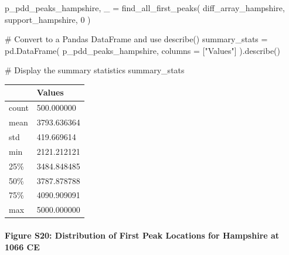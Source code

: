 \documentclass[
  11pt,
  letterpaper,
  DIV=11,
  numbers=noendperiod]{scrartcl}
\let\oldparagraph\paragraph
\renewcommand{\paragraph}[1]{\oldparagraph{#1}\mbox{}}
\newenvironment{Shaded}{\begin{snugshade}}{\end{snugshade}}
\newcommand{\CommentTok}[1]{\textcolor[rgb]{0.37,0.37,0.37}{#1}}
\newcommand{\DecValTok}[1]{\textcolor[rgb]{0.68,0.00,0.00}{#1}}
\newcommand{\NormalTok}[1]{\textcolor[rgb]{0.00,0.23,0.31}{#1}}
\newcommand{\OperatorTok}[1]{\textcolor[rgb]{0.37,0.37,0.37}{#1}}
\newcommand{\StringTok}[1]{\textcolor[rgb]{0.13,0.47,0.30}{#1}}
\begin{document}
\begin{Shaded}
\begin{Highlighting}[]
\NormalTok{p\_pdd\_peaks\_hampshire, \_ }\OperatorTok{=}\NormalTok{ find\_all\_first\_peaks(}
\NormalTok{    diff\_array\_hampshire, }
\NormalTok{    support\_hampshire, }
    \DecValTok{0}
\NormalTok{)}

\CommentTok{\# Convert to a Pandas DataFrame and use describe()}
\NormalTok{summary\_stats }\OperatorTok{=}\NormalTok{ pd.DataFrame(}
\NormalTok{    p\_pdd\_peaks\_hampshire, }
\NormalTok{    columns }\OperatorTok{=}\NormalTok{ [}\StringTok{"Values"}\NormalTok{]}
\NormalTok{).describe()}

\CommentTok{\# Display the summary statistics}
\NormalTok{summary\_stats}
\end{Highlighting}
\end{Shaded}

\begin{longtable}[]{@{}ll@{}}
\toprule\noalign{}
& Values \\
\midrule\noalign{}
\endhead
\bottomrule\noalign{}
\endlastfoot
count & 500.000000 \\
mean & 3793.636364 \\
std & 419.669614 \\
min & 2121.212121 \\
25\% & 3484.848485 \\
50\% & 3787.878788 \\
75\% & 4090.909091 \\
max & 5000.000000 \\
\end{longtable}

\paragraph{Figure S20: Distribution of First Peak Locations for
Hampshire at 1066
CE}\label{figure-s20-distribution-of-first-peak-locations-for-hampshire-at-1066-ce}
\end{document}

